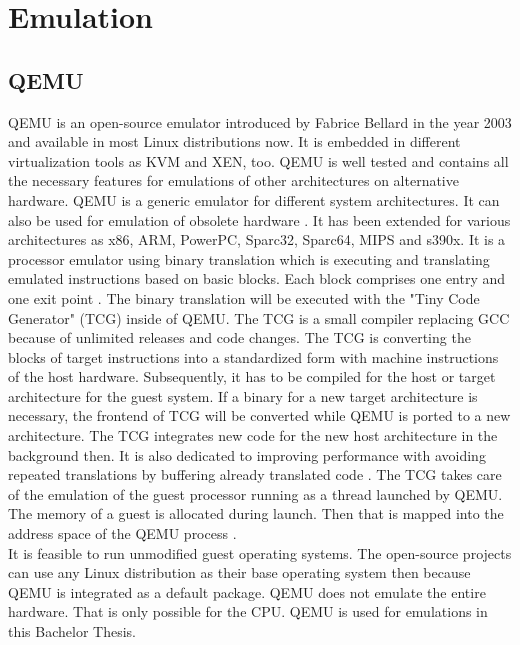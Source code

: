 
\chapter{Emulation}\label{ch:emulation}

\section{QEMU}

\gls{QEMU} is an open-source emulator introduced by Fabrice Bellard in the year 2003 \cite{Bellard2003} and available in most Linux distributions now. It is embedded in different virtualization tools as \gls{KVM} and \gls{XEN}, too. \gls{QEMU} is well tested and contains all the necessary features for emulations of other architectures on alternative hardware. 
\gls{QEMU} is a generic emulator for different system architectures. It can also be used for emulation of obsolete hardware \cite[~p.24]{Opsahl2013}. 
It has been extended for various architectures as x86, ARM, PowerPC, Sparc32, Sparc64, MIPS and s390x.
It is a processor emulator using binary translation \cite{Butt2011} which is executing and translating emulated instructions based on basic blocks. Each block comprises one entry and one exit point \cite[~p.5]{Wang2010}. 
The binary translation will be executed with the "Tiny Code Generator" (TCG) inside of \gls{QEMU}. 
The TCG is a small compiler replacing GCC because of unlimited releases and code changes. The TCG is converting the blocks of target instructions into a standardized form with machine instructions of the host hardware. 
Subsequently, it has to be compiled for the host or target architecture for the guest system. 
If a binary for a new target architecture is necessary, the frontend of TCG will be converted while \gls{QEMU} is ported to a new architecture. 
The TCG integrates new code for the new host architecture in the background then. It is also dedicated to improving performance with avoiding repeated translations by buffering already translated code \cite{Cota2017}. 
The TCG takes care of the emulation of the guest processor running as a thread launched by \gls{QEMU}. The memory of a guest is allocated during launch. Then that is mapped into the address space of the \gls{QEMU} process  \cite[~p.29]{Opsahl2013}.\\
It is feasible to run unmodified guest operating systems. The open-source projects can use any Linux distribution as their base operating system then because \gls{QEMU} is integrated as a default package. 
\gls{QEMU} does not emulate the entire hardware. That is only possible for the CPU. \gls{QEMU} is used for emulations in this Bachelor Thesis.


